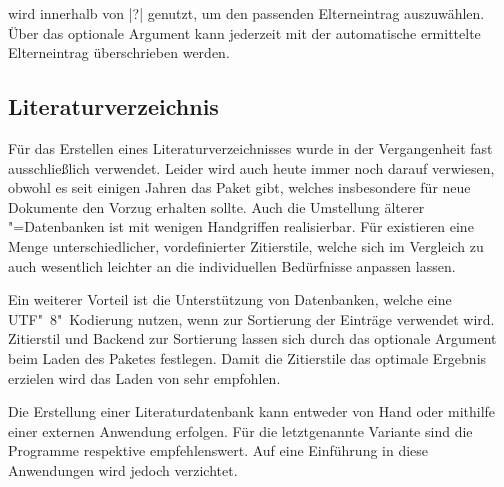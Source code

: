 \documentclass[%
  english,ngerman,%
  cdgeometry=no,DIV=12,automark%
]{tudscrartcl}
\begin{document}
wird innerhalb von |?| genutzt, um den passenden 
Elterneintrag auszuwählen. Über das optionale Argument kann jederzeit mit 
 der automatische ermittelte 
Elterneintrag überschrieben werden.
%
\begin{Hint}
\newcommand*\symbollettergroup{}
\newcommand*{\newformulasymbol}[5][]{%
  \ifisgreeksymbol{#4}{%
    \renewcommand*{\symbollettergroup}{greekletters}%
  }{%
    \renewcommand*{\symbollettergroup}{romanletters}%
  }%
  \newglossaryentry{#2}{%
    type=symbols,%
    name={#3},%
    description={\nopostdesc},%
    symbol={\ensuremath{#4}},%
    user1={\ensuremath{\mathrm{#5}}},%
    sort={#2},%
    parent={\symbollettergroup},%
    #1%
  }%
}
\end{Hint}


\subsection{Literaturverzeichnis}
\label{sec:biblatex}%
%
Für das Erstellen eines Literaturverzeichnisses wurde in der Vergangenheit fast 
ausschließlich  verwendet. Leider wird auch heute immer noch 
darauf verwiesen, obwohl es seit einigen Jahren das Paket  
gibt, welches insbesondere für neue Dokumente den Vorzug erhalten sollte. Auch 
die Umstellung älterer "=Datenbanken ist mit wenigen Handgriffen 
realisierbar. Für  existieren eine Menge unterschiedlicher, 
vordefinierter Zitierstile, welche sich im Vergleich zu  auch 
wesentlich leichter an die individuellen Bedürfnisse anpassen lassen.

Ein weiterer Vorteil ist die Unterstützung von Datenbanken, welche eine 
UTF"~8"~Kodierung nutzen, wenn  zur Sortierung der Einträge 
verwendet wird. Zitierstil und Backend zur Sortierung lassen sich durch das 
optionale Argument beim Laden des Paketes festlegen. Damit die Zitierstile das 
optimale Ergebnis erzielen wird das Laden von  sehr empfohlen.
%
\begin{Preamble}
\usepackage{csquotes}
\usepackage[backend=biber,style=alphabetic]{biblatex}

\end{Preamble}
%
Die Erstellung einer Literaturdatenbank kann entweder von Hand oder mithilfe 
einer externen Anwendung erfolgen. Für die letztgenannte Variante sind die 
Programme  respektive  empfehlenswert. 
Auf eine Einführung in diese Anwendungen wird jedoch verzichtet. 
\end{document}
